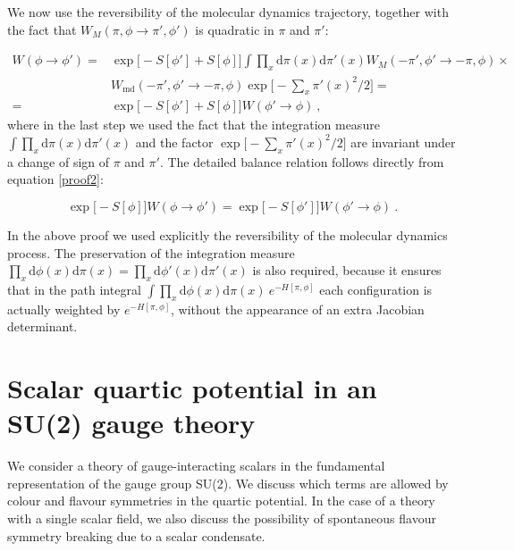 We now use the  reversibility of the molecular dynamics trajectory, together with the fact that $W_M(\pi,\phi \to \pi',\phi')$ is quadratic in $\pi$ and $\pi'$:

\begin{equation}
\begin{split}
W(\phi \to \phi') = & \exp \bigl[ - S[\phi'] + S[\phi] \bigr] \int \prod_{x} \mathrm{d} \pi(x) \mathrm{d} \pi'(x) W_M(-\pi',\phi' \to -\pi,\phi) \times \\
& W_{\mathrm{md}}(-\pi',\phi' \to -\pi,\phi) \exp \bigl[ -\sum_x \pi'(x)^2 /2 \bigr] = \\
= &  \exp \bigl[ - S[\phi'] + S[\phi] \bigr] W(\phi' \to \phi) \: ,
\end{split}
\label{proof2}
\end{equation}
%
where in the last step we used the fact that the integration measure $ \int \prod_{x} \mathrm{d} \pi(x) \mathrm{d} \pi'(x)$ and the factor $\exp \bigl[ -\sum_x \pi'(x)^2 /2 \bigr]$ are invariant under a change of sign of $\pi$ and $\pi'$. The detailed balance relation follows directly from equation \ref{proof2}:

\begin{equation}
\exp \bigl[ -  S[\phi] \bigr]W(\phi \to \phi') =\exp \bigl[ - S[\phi'] \bigr] W(\phi' \to \phi) \: .
\end{equation}

In the above proof we used explicitly the reversibility of the molecular dynamics process. The preservation of the integration measure $ \prod_{x} \mathrm{d} \phi(x) \mathrm{d} \pi(x) =  \prod_{x} \mathrm{d} \phi'(x) \mathrm{d} \pi'(x)$ is also required, because it ensures that in the path integral  $\int \prod_{x} \mathrm{d} \phi(x) \mathrm{d} \pi(x) \: e^{-H[\pi,\phi]}$ each configuration is actually weighted by $e^{-H[\pi,\phi]}$, without the appearance of an extra Jacobian determinant. 


\section{Scalar quartic potential in an SU(2) gauge theory}
\label{app_quartic_potential}

We consider a theory of gauge-interacting scalars in the fundamental representation of the gauge group SU(2). We discuss which terms are allowed by colour and flavour symmetries in the quartic potential. In the case of a theory with a single scalar field, we also discuss the possibility of spontaneous flavour symmetry breaking due to a scalar condensate.

